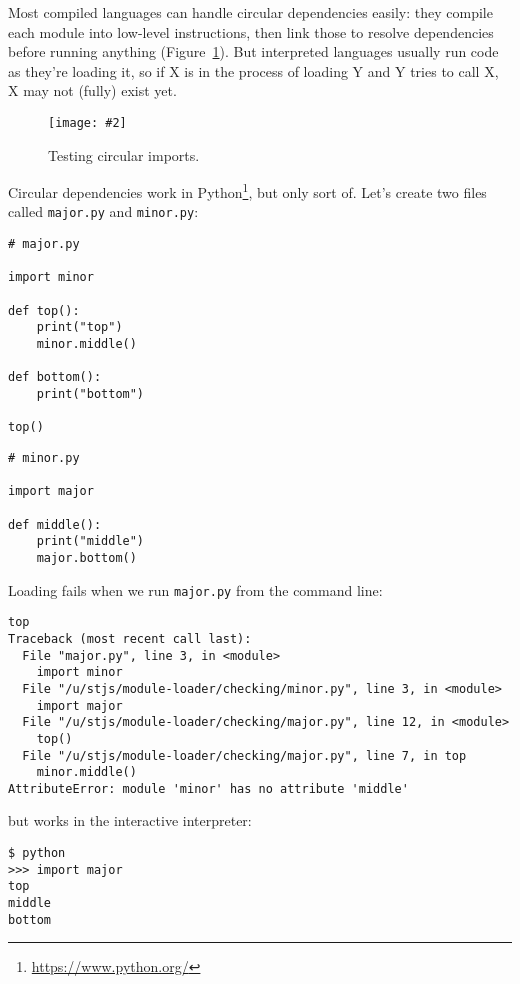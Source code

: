 \documentclass[krantzl]{krantz}
\newcommand{\figpdf}[4]{\begin{figure}%
\centering%
\texttt{[image: \#2]}%
\caption{#3}%
\label{#1}%
\end{figure}}
\newcommand{\figref}[1]{Figure~\ref{#1}}
\newcommand{\hreffoot}[2]{{#1}\footnote{\href{#2}{#2}}}
\begin{document}
Most compiled languages can handle circular dependencies easily:
they compile each module into low-level instructions,
then link those to resolve dependencies before running anything
(\figref{module-loader-circularity}).
But interpreted languages usually run code as they’re loading it,
so if X is in the process of loading Y and Y tries to call X,
X may not (fully) exist yet.

\figpdf{module-loader-circularity}{./module-loader/circularity.pdf}{Testing circular imports.}{0.6}


Circular dependencies work in \hreffoot{Python}{https://www.python.org/},
but only sort of.
Let’s create two files called \texttt{major.py} and \texttt{minor.py}:


\begin{lstlisting}[frame=tblr]
# major.py

import minor

def top():
    print("top")
    minor.middle()

def bottom():
    print("bottom")

top()
\end{lstlisting}



\begin{lstlisting}[frame=tblr]
# minor.py

import major

def middle():
    print("middle")
    major.bottom()
\end{lstlisting}



Loading fails when we run \texttt{major.py} from the command line:


\begin{lstlisting}[frame=tblr,backgroundcolor=\color{black!5}]
top
Traceback (most recent call last):
  File "major.py", line 3, in <module>
    import minor
  File "/u/stjs/module-loader/checking/minor.py", line 3, in <module>
    import major
  File "/u/stjs/module-loader/checking/major.py", line 12, in <module>
    top()
  File "/u/stjs/module-loader/checking/major.py", line 7, in top
    minor.middle()
AttributeError: module 'minor' has no attribute 'middle'
\end{lstlisting}



\noindent but works in the interactive interpreter:


\begin{lstlisting}[frame=tblr,backgroundcolor=\color{black!5}]
$ python
>>> import major
top
middle
bottom
\end{lstlisting}
\end{document}
